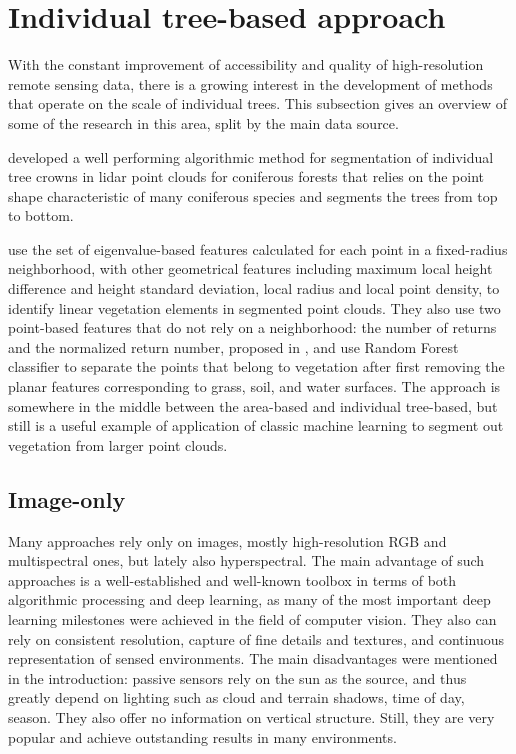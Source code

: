 \section{Individual tree-based approach}\label{sec-individual-tree-approach}

With the constant improvement of accessibility and quality of high-resolution remote sensing data, there is a growing interest in the development of methods that operate on the scale of individual trees.
This subsection gives an overview of some of the research in this area, split by the main data source.

\citet{liNewMethodSegmenting2012} developed a well performing algorithmic method for segmentation of individual tree crowns in \gls{lidar} point clouds for coniferous forests that relies on the point shape characteristic of many coniferous species and segments the trees from top to bottom.

\citet{lucasIdentificationLinearVegetation2019} use the set of eigenvalue-based features calculated for each point in a fixed-radius neighborhood, with other geometrical features including maximum local height difference and height standard deviation, local radius and local point density, to identify linear vegetation elements in segmented point clouds.
They also use two point-based features that do not rely on a neighborhood: the number of returns and the normalized return number, proposed in \citet{guoRelevanceAirborneLidar2011}, and use Random Forest classifier to separate the points that belong to vegetation after first removing the planar features corresponding to grass, soil, and water surfaces.
The approach is somewhere in the middle between the area-based and individual tree-based, but still is a useful example of application of classic machine learning to segment out vegetation from larger point clouds.

\subsection{Image-only}

Many approaches rely only on images, mostly high-resolution RGB and multispectral ones, but lately also hyperspectral.
The main advantage of such approaches is a well-established and well-known toolbox in terms of both algorithmic processing and deep learning, as many of the most important deep learning milestones were achieved in the field of computer vision.
They also can rely on consistent resolution, capture of fine details and textures, and continuous representation of sensed environments.
The main disadvantages were mentioned in the introduction: passive sensors rely on the sun as the source, and thus greatly depend on lighting such as cloud and terrain shadows, time of day, season.
They also offer no information on vertical structure.
Still, they are very popular and achieve outstanding results in many environments.

